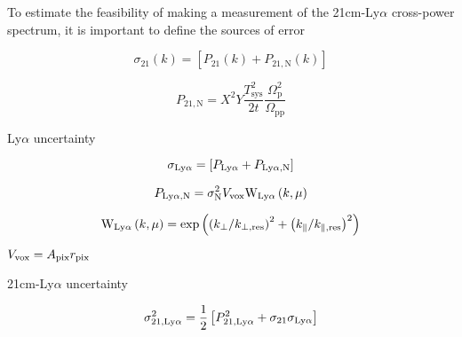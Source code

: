 To estimate the feasibility of making a measurement of the 21cm-Ly$\alpha$ cross-power
spectrum, it is important to define the sources of error

\begin{equation}
\sigma_{21} \left(k \right) = \left[ P_{21} \left(k \right) + P_{21, \textrm{N}} \left(k \right) \right]
\end{equation}

\begin{equation}
P_{21, \textrm{N}} = X^2 Y \frac{T^2_{\textrm{sys}}}{2 t} \frac{\Omega_{\textrm{p}}^2}{\Omega_{\textrm{pp}}}
\end{equation}

Ly$\alpha$ uncertainty

\begin{equation}
  \sigma_{\rm Ly\alpha} = \left[ P_{\rm Ly\alpha} + P_{\textrm{Ly}\alpha, \textrm{N}} \right]
\end{equation}

\begin{equation}
P_{\textrm{Ly}\alpha, \textrm{N}} = \sigma_{\rm N}^2 V_{\text{vox}} \textrm{W}_{\rm Ly\alpha}\left(k, \mu \right)
\end{equation}

\begin{equation}
  \textrm{W}_{\rm Ly\alpha}\left(k, \mu \right) = \exp \left(\left( k_{\perp} / k_{\perp, \textrm{res}}\right)^2 + \left( k_{\parallel} / k_{\parallel, \textrm{res}}\right)^2\right)
\end{equation}


$V_{\rm vox} = A_{\rm pix} r_{\rm pix}$

21cm-Ly$\alpha$ uncertainty


\begin{equation}
    \sigma^2_{21, \rm Ly\alpha} = \frac{1}{2} \left[ P^2_{21, \rm Ly\alpha} + \sigma_{21} \sigma_{\rm Ly\alpha} \right]
\end{equation}
